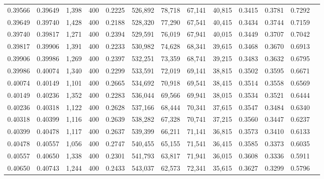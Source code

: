 \begin{tabular}{rrrrrrrrrrrrr}
0.39566 & 0.39649 &  1,398 & 400 &                                     0.2225 & 526,892 &  78,718 &  67,141 &  40,815 & 0.3415 & 0.3781 & 0.7292 \\
0.39649 & 0.39740 &  1,428 & 400 &                                     0.2188 & 528,320 &  77,290 &  67,541 &  40,415 & 0.3434 & 0.3744 & 0.7159 \\
0.39740 & 0.39817 &  1,271 & 400 &                                     0.2394 & 529,591 &  76,019 &  67,941 &  40,015 & 0.3449 & 0.3707 & 0.7042 \\
0.39817 & 0.39906 &  1,391 & 400 &                                     0.2233 & 530,982 &  74,628 &  68,341 &  39,615 & 0.3468 & 0.3670 & 0.6913 \\
0.39906 & 0.39986 &  1,269 & 400 &                                     0.2397 & 532,251 &  73,359 &  68,741 &  39,215 & 0.3483 & 0.3632 & 0.6795 \\
0.39986 & 0.40074 &  1,340 & 400 &                                     0.2299 & 533,591 &  72,019 &  69,141 &  38,815 & 0.3502 & 0.3595 & 0.6671 \\
0.40074 & 0.40149 &  1,101 & 400 &                                     0.2665 & 534,692 &  70,918 &  69,541 &  38,415 & 0.3514 & 0.3558 & 0.6569 \\
0.40149 & 0.40236 &  1,352 & 400 &                                     0.2283 & 536,044 &  69,566 &  69,941 &  38,015 & 0.3534 & 0.3521 & 0.6444 \\
0.40236 & 0.40318 &  1,122 & 400 &                                     0.2628 & 537,166 &  68,444 &  70,341 &  37,615 & 0.3547 & 0.3484 & 0.6340 \\
0.40318 & 0.40399 &  1,116 & 400 &                                     0.2639 & 538,282 &  67,328 &  70,741 &  37,215 & 0.3560 & 0.3447 & 0.6237 \\
0.40399 & 0.40478 &  1,117 & 400 &                                     0.2637 & 539,399 &  66,211 &  71,141 &  36,815 & 0.3573 & 0.3410 & 0.6133 \\
0.40478 & 0.40557 &  1,056 & 400 &                                     0.2747 & 540,455 &  65,155 &  71,541 &  36,415 & 0.3585 & 0.3373 & 0.6035 \\
0.40557 & 0.40650 &  1,338 & 400 &                                     0.2301 & 541,793 &  63,817 &  71,941 &  36,015 & 0.3608 & 0.3336 & 0.5911 \\
0.40650 & 0.40743 &  1,244 & 400 &                                     0.2433 & 543,037 &  62,573 &  72,341 &  35,615 & 0.3627 & 0.3299 & 0.5796 \\

\end{tabular}
